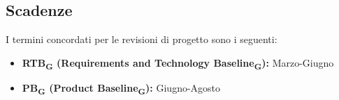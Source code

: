 \subsection{Scadenze}
I termini concordati per le revisioni di progetto sono i seguenti:
\begin{itemize}
	\item \textbf{RTB\textsubscript{G} (Requirements and Technology Baseline\textsubscript{G}):} {Marzo-Giugno}
	\item \textbf{PB\textsubscript{G} (Product Baseline\textsubscript{G}):} {Giugno-Agosto}
\end{itemize}